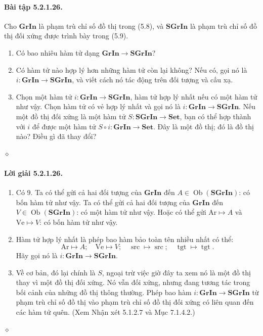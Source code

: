 \paragraph{Bài tập 5.2.1.26.} Cho $\mathbf{GrIn}$ là phạm trù chỉ số đồ thị trong (5.8), và $\mathbf{SGrIn}$ là phạm trù chỉ số đồ thị đối xứng được trình bày trong (5.9).
\begin{enumerate}[label=\alph*.]
\item Có bao nhiêu hàm tử dạng $\mathbf{GrIn}\to\mathbf{SGrIn}$?
\item Có hàm tử nào hợp lý hơn những hàm tử còn lại không? Nếu có, gọi nó là $i:\mathbf{GrIn}\to\mathbf{SGrIn}$, và viết cách nó tác động trên đối tượng và cấu xạ.
\item Chọn một hàm tử $i:\mathbf{GrIn}\to\mathbf{SGrIn}$, hàm tử hợp lý nhất nếu có một hàm tử như vậy. Chọn hàm tử có vẻ hợp lý nhất và gọi nó là $i:\mathbf{GrIn}\to\mathbf{SGrIn}$. Nếu một đồ thị đối xứng là một hàm tử $S:\mathbf{SGrIn}\to\mathbf{Set}$, bạn có thể hợp thành với $i$ để được một hàm tử $S\circ i:\mathbf{GrIn}\to\mathbf{Set}$. Đây là một đồ thị; đó là đồ thị nào? Điều gì đã thay đổi?
\end{enumerate}\hfill$\diamond$
\paragraph{Lời giải 5.2.1.26.}
\begin{enumerate}[label=\alph*.]
\item Có 9. Ta có thể gửi cả hai đối tượng của $\mathbf{GrIn}$ đến $A\in\operatorname{Ob}(\mathbf{SGrIn})$: có bốn hàm tử như vậy. Ta có thể gửi cả hai đối tượng của $\mathbf{GrIn}$ đến $V\in\operatorname{Ob}(\mathbf{SGrIn})$: có một hàm tử như vậy. Hoặc có thể gửi $\mathrm{Ar}\mapsto A$ và $\mathrm{Ve}\mapsto V$: có bốn hàm tử như vậy.
\item Hàm tử hợp lý nhất là phép bao hàm bảo toàn tên nhiều nhất có thể:
\[\mathrm{Ar}\mapsto A;\quad\mathrm{Ve}\mapsto V;\quad\operatorname{src}\mapsto\operatorname{src};\quad\operatorname{tgt}\mapsto\operatorname{tgt}.\]
Hãy gọi nó là $i:\mathbf{GrIn}\to\mathbf{SGrIn}$.
\item Về cơ bản, đó lại chính là $S$, ngoại trừ việc giờ đây ta xem nó là một đồ thị thay vì một đồ thị đối xứng. Nó vẫn đối xứng, nhưng đang tương tác trong bối cảnh của những đồ thị thông thường. Phép bao hàm $i:\mathbf{GrIn}\to\mathbf{SGrIn}$ từ phạm trù chỉ số đồ thị vào phạm trù chỉ số đồ thị đối xứng có liên quan đến các hàm tử quên. (Xem Nhận xét 5.1.2.7 và Mục 7.1.4.2.)
\end{enumerate}\hfill$\diamond$

